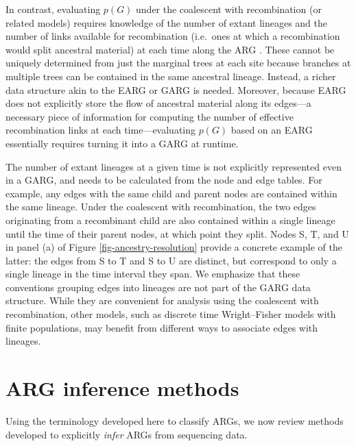 \documentclass{article}
\begin{document}
In contrast, evaluating $p(G)$ under the coalescent with recombination
(or related models) requires knowledge of the number of extant lineages and
the number of links available for recombination (i.e.\ ones at which a recombination
would split ancestral material) at each time along the ARG
\citep[Eq.\ (3)]{mahmoudi2022bayesian}. These cannot be uniquely determined
from just the marginal trees at each site because branches at multiple trees can be
contained in the same ancestral lineage. Instead, a richer data structure akin to the
EARG or GARG is needed. Moreover, because EARG does not explicitly store the flow
of ancestral material along its edges---a necessary piece of information for
computing the number of effective recombination links at each time---evaluating
$p(G)$ based on an EARG essentially requires turning it into a GARG at runtime.

The number of extant lineages at a given time is not explicitly represented even
in a GARG, and needs to be calculated from the node and edge tables.
For example, any edges with the same child and parent nodes are contained within
the same lineage. Under the coalescent with recombination, the two edges
originating from a recombinant child are also contained within a single lineage
until the time of their parent nodes, at which point they split. Nodes S, T, and U
in panel (a) of Figure \ref{fig-ancestry-resolution} provide a concrete example
of the latter: the edges from S to T and S to U are distinct, but correspond to only
a single lineage in the time interval they span. We emphasize that these
conventions grouping edges into lineages are not part of the GARG data structure.
While they are convenient for analysis using the coalescent with recombination,
other models, such as discrete time Wright--Fisher models with finite populations,
may benefit from different ways to associate edges with lineages.

\section*{ARG inference methods}\label{ARG_inference_methods}
Using the terminology developed here to classify ARGs, we now review methods developed
to explicitly \emph{infer} ARGs from sequencing data.
\end{document}
